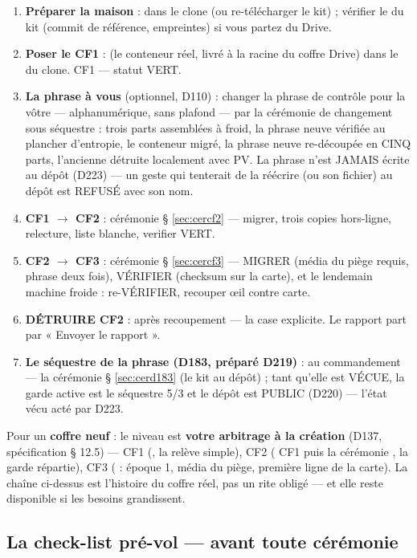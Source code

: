 \begin{enumerate}
\item \textbf{Préparer la maison} :  dans le clone (ou re-télécharger
le kit) ; vérifier le  du kit (commit de référence, empreintes)
si vous partez du Drive.
\item \textbf{Poser le CF1} :  (le conteneur réel, livré à la
racine du coffre Drive) dans le  du clone. CF1 — statut
VERT.
\item \textbf{La phrase à vous} (optionnel, D110) : changer la phrase de contrôle
pour la vôtre — alphanumérique, sans plafond — par la cérémonie de
changement sous séquestre : trois parts assemblées à froid, la phrase neuve
vérifiée au plancher d'entropie, le conteneur migré, la phrase neuve
re-découpée en CINQ parts, l'ancienne détruite localement avec PV. La
phrase n'est JAMAIS écrite au dépôt (D223) — un geste qui tenterait de la
réécrire (ou son fichier) au dépôt est REFUSÉ avec son nom.
\item \textbf{CF1 $\to$ CF2} : cérémonie § \ref{sec:cercf2} — migrer, trois copies
hors-ligne, relecture, liste blanche, verifier VERT.
\item \textbf{CF2 $\to$ CF3} : cérémonie § \ref{sec:cercf3} — MIGRER (média du piège
requis, phrase deux fois), VÉRIFIER (checksum sur la carte), et le lendemain machine
froide : re-VÉRIFIER, recouper œil contre carte.
\item \textbf{DÉTRUIRE CF2} : après recoupement — la case explicite. Le rapport
part par « Envoyer le rapport ».
\item \textbf{Le séquestre de la phrase (D183, préparé D219)} : au
commandement — la cérémonie § \ref{sec:cerd183} (le kit au dépôt) ; tant
qu'elle est VÉCUE, la garde active est le séquestre 5/3 et le dépôt est
PUBLIC (D220) — l'état vécu acté par D223.
\end{enumerate}

Pour un \textbf{coffre neuf} : le niveau est \textbf{votre arbitrage à la création}
(D137, spécification § 12.5) — CF1 (, la relève simple),
CF2 ( CF1 puis la cérémonie , la garde
répartie), CF3 ( : époque 1, média du piège, première
ligne de la carte). La chaîne ci-dessus est l'histoire du coffre réel, pas un rite
obligé — et elle reste disponible si les besoins grandissent.

\subsection{La check-list pré-vol — avant toute cérémonie}\label{sec:preflight}

